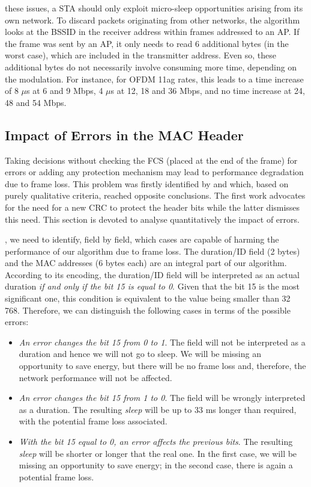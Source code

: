 \documentclass[twoside,nohyper]{tufte-book}
\providecommand{\tightlist}{%
  \setlength{\itemsep}{0pt}\setlength{\parskip}{0pt}}
\theoremstyle{definition}
\theoremstyle{definition}
\theoremstyle{definition}
\theoremstyle{remark}
\begin{document}
 these issues, a STA should only
exploit micro-sleep opportunities arising from its own network. To
discard packets originating from other networks, the algorithm looks at
the BSSID in the receiver address within frames addressed to an AP. If
the frame was sent by an AP, it only needs to read 6 additional bytes
(in the worst case), which are included in the transmitter address. Even
so, these additional bytes do not necessarily involve consuming more
time, depending on the modulation. For instance, for OFDM 11ag rates,
this leads to a time increase of 8 \(\mu\)s at 6 and 9 Mbps, 4 \(\mu\)s
at 12, 18 and 36 Mbps, and no time increase at 24, 48 and 54 Mbps.

\subsection{Impact of Errors in the MAC
Header}\label{impact-of-errors-in-the-mac-header}

Taking decisions without checking the FCS (placed at the end of the
frame) for errors or adding any protection mechanism may lead to
performance degradation due to frame loss. This problem was firstly
identified by \citet{Balaji2010}\cite{Balaji2010} and
\citet{Prasad2014}\cite{Prasad2014} which, based on purely qualitative
criteria, reached opposite conclusions. The first work advocates for the
need for a new CRC to protect the header bits while the latter dismisses
this need. This section is devoted to analyse quantitatively the impact
of errors.

, we need to identify, field by field,
which cases are capable of harming the performance of our algorithm due
to frame loss. The duration/ID field (2 bytes) and the MAC addresses (6
bytes each) are an integral part of our algorithm. According to its
encoding, the duration/ID field will be interpreted as an actual
duration \emph{if and only if the bit 15 is equal to 0}. Given that the
bit 15 is the most significant one, this condition is equivalent to the
value being smaller than 32 768. Therefore, we can distinguish the
following cases in terms of the possible errors:

\begin{itemize}
\tightlist
\item
  \emph{An error changes the bit 15 from 0 to 1}. The field will not be
  interpreted as a duration and hence we will not go to sleep. We will
  be missing an opportunity to save energy, but there will be no frame
  loss and, therefore, the network performance will not be affected.
\item
  \emph{An error changes the bit 15 from 1 to 0}. The field will be
  wrongly interpreted as a duration. The resulting \emph{sleep} will be
  up to 33 ms longer than required, with the potential frame loss
  associated.
\item
  \emph{With the bit 15 equal to 0, an error affects the previous bits}.
  The resulting \emph{sleep} will be shorter or longer that the real
  one. In the first case, we will be missing an opportunity to save
  energy; in the second case, there is again a potential frame loss.
\end{itemize}
\end{document}
